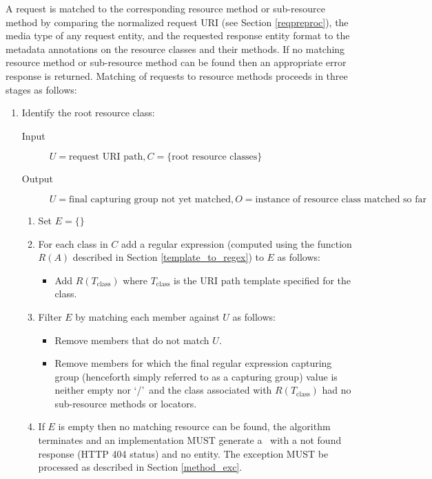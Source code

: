 A request is matched to the corresponding resource method or sub-resource method by comparing the normalized request URI (see Section \ref{reqpreproc}), the media type of any request entity, and the requested response entity format to the metadata annotations on the resource classes and their methods. If no matching resource method or sub-resource method can be found then an appropriate error response is returned. Matching of requests to resource methods proceeds in three stages as follows:

\begin{enumerate}
\item Identify the root resource class:

\begin{description}
\item[Input]  $U=\mbox{request URI path},C=\{\mbox{root resource classes}\}$
\item[Output] $U=\mbox{final capturing group not yet matched}, O=\mbox{instance of resource class matched so far}$
\end{description}

\begin{enumerate}
\item Set $E=\{\}$

\item For each class in $C$ add a regular expression (computed using the function $R(A)$ described in Section \ref{template_to_regex}) to $E$ as follows:
\begin{itemize}
\item Add $R(T_{\mbox{class}})$ where $T_{\mbox{class}}$ is the URI path template specified for the class.
\end{itemize}

\item Filter $E$ by matching each member against $U$ as follows:
\begin{itemize}
\item Remove members that do not match $U$.
\item Remove members for which the final regular expression capturing group (henceforth simply referred to as a capturing group) value is neither empty nor \lq/\rq\ and the class associated with $R(T_{\mbox{class}})$ had no sub-resource methods or locators.
\end{itemize}

\item If $E$ is empty then no matching resource can be found, the algorithm terminates and an implementation MUST generate a \WebAppExc\ with a not found response (HTTP 404 status) and no entity. The exception MUST be processed as described in Section \ref{method_exc}.


\end{enumerate}
\end{enumerate}
